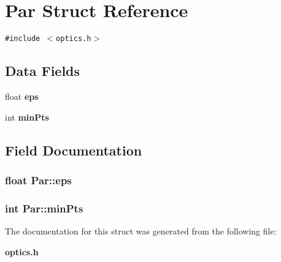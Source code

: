 \section{Par Struct Reference}
\label{structPar}
{\tt \#include $<$optics.h$>$}

\subsection*{Data Fields}
\begin{CompactItemize}
\item 
float {\bf eps}
\item 
int {\bf minPts}
\end{CompactItemize}


\subsection{Field Documentation}
\subsubsection{\setlength{\rightskip}{0pt plus 5cm}float {\bf Par::eps}}\label{structPar_f81a78f681e1d13247e6ca89b29dafaf}


\subsubsection{\setlength{\rightskip}{0pt plus 5cm}int {\bf Par::minPts}}\label{structPar_3ce6a713654971d75f0eccfc039af7f2}




The documentation for this struct was generated from the following file:\begin{CompactItemize}
\item 
{\bf optics.h}\end{CompactItemize}
